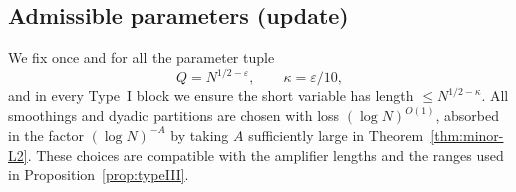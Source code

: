 \documentclass[11pt]{article}
\theoremstyle{definition}
\theoremstyle{remark}
\numberwithin{equation}{part}
\begin{document}



\subsection{Admissible parameters (update)}
We fix once and for all the parameter tuple
\[
	Q=N^{1/2-\varepsilon},\qquad \kappa=\varepsilon/10,
\]
and in every Type~I block we ensure the short variable has length $\le N^{1/2-\kappa}$. All smoothings and dyadic partitions are chosen with loss $(\log N)^{O(1)}$, absorbed in the factor $(\log N)^{-A}$ by taking $A$ sufficiently large in Theorem~\ref{thm:minor-L2}. These choices are compatible with the amplifier lengths and the ranges used in Proposition~\ref{prop:typeIII}.
\end{document}
